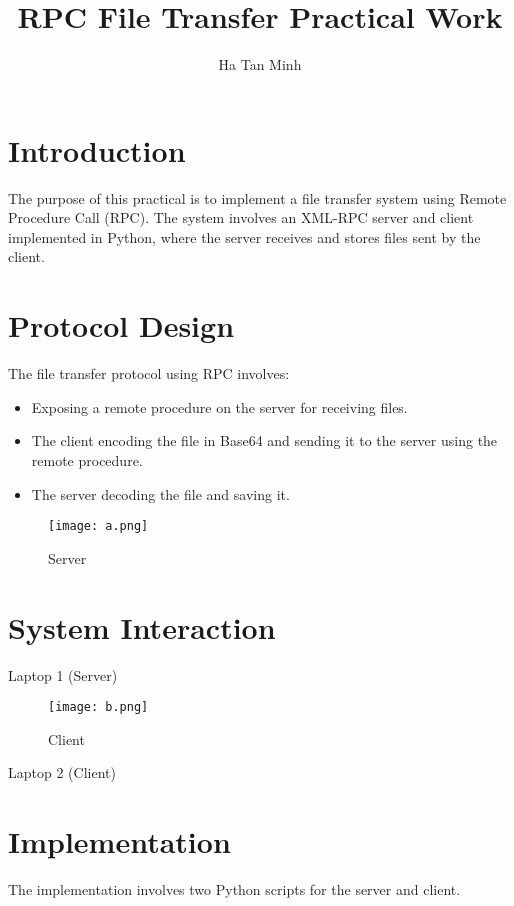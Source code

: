 \documentclass{article}
\title{RPC File Transfer Practical Work}
\author{Ha Tan Minh}
\date{}
\begin{document}
\maketitle

\section{Introduction}
The purpose of this practical is to implement a file transfer system using Remote Procedure Call (RPC). The system involves an XML-RPC server and client implemented in Python, where the server receives and stores files sent by the client.

\section{Protocol Design}
The file transfer protocol using RPC involves:
\begin{itemize}
    \item Exposing a remote procedure on the server for receiving files.
    \item The client encoding the file in Base64 and sending it to the server using the remote procedure.
    \item The server decoding the file and saving it.
\end{itemize}
\begin{figure}
    \centering
    \texttt{[image: a.png]}
    \caption{Server}
    \label{fig:rpc-interaction}
\end{figure}

\section{System Interaction}

\begin{center}
Laptop 1 (Server)
\end{center}

\begin{figure}
    \centering
    \texttt{[image: b.png]}
    \caption{Client}
    \label{fig:rpc-details}
\end{figure}

\begin{center}
Laptop 2 (Client)
\end{center}

\section{Implementation}
The implementation involves two Python scripts for the server and client.
\end{document}

